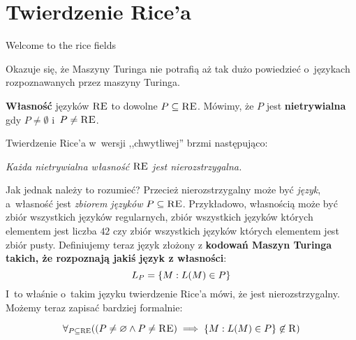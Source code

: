 \section{Twierdzenie Rice'a}
\epigraph{Welcome to the rice fields}{}


Okazuje się, że Maszyny Turinga nie potrafią aż tak dużo powiedzieć o~językach rozpoznawanych przez maszyny Turinga.

\begin{definition}
	\textbf{Własność} języków \(\textsc{RE}\) to dowolne \(P \subseteq \textsc{RE}\). Mówimy, że \(P\) jest \textbf{nietrywialna} gdy \(P \neq \emptyset\) i~\(P \neq \textsc{RE}\).
\end{definition}

Twierdzenie Rice'a w~wersji ,,chwytliwej'' brzmi następująco:
\begin{center}
	\emph{Każda nietrywialna własność \(\textsc{RE}\) jest nierozstrzygalna.}
\end{center}
Jak jednak należy to rozumieć? Przecież nierozstrzygalny może być \emph{język}, a~własność jest \emph{zbiorem języków} \(P \subseteq \textsc{RE}\). Przykładowo, własnością może być zbiór wszystkich języków regularnych, zbiór wszystkich języków których elementem jest liczba \(42\) czy zbiór wszystkich języków których elementem jest zbiór pusty. Definiujemy teraz język złożony z \textbf{kodowań Maszyn Turinga takich, że rozpoznają jakiś język z własności}:
\[
	L_P = \set{M : L\pars{M} \in P}
\]
I~to właśnie o~takim języku twierdzenie Rice'a mówi, że jest nierozstrzygalny. Możemy teraz zapisać bardziej formalnie:
\begin{theorem}[Rice]
	\[
		\forall_{P \subseteq \re}\pars{\pars{P \neq \emptyset \land P \neq \re} \implies \set{M : L\pars{M} \in P} \not\in \r}
	\]
\end{theorem}
